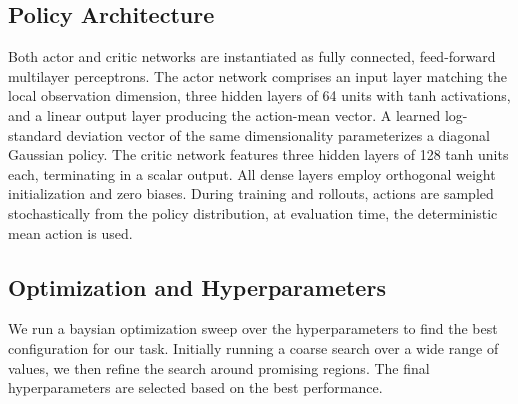 \subsection{Policy Architecture}
Both actor and critic networks are instantiated as fully connected, feed-forward multilayer perceptrons. The actor network comprises an input layer matching the local observation dimension, three hidden layers of 64 units with tanh activations, and a linear output layer producing the action-mean vector. A learned log-standard deviation vector of the same dimensionality parameterizes a diagonal Gaussian policy. The critic network features three hidden layers of 128 tanh units each, terminating in a scalar output. All dense layers employ orthogonal weight initialization and zero biases. During training and rollouts, actions are sampled stochastically from the policy distribution, at evaluation time, the deterministic mean action is used.

\subsection{Optimization and Hyperparameters}
We run a baysian optimization sweep over the hyperparameters to find the best configuration for our task. Initially running a coarse search over a wide range of values, we then refine the search around promising regions. The final hyperparameters are selected based on the best performance.


